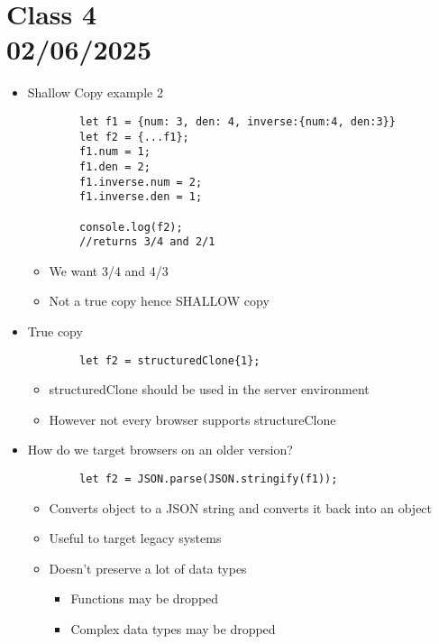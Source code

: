 \documentclass{article}
\begin{document}
\section*{Class 4 \\ 02/06/2025}\label{sec:Class 4}
\begin{itemize}
    \item Shallow Copy example 2
    \begin{lstlisting}
        let f1 = {num: 3, den: 4, inverse:{num:4, den:3}}
        let f2 = {...f1};
        f1.num = 1;
        f1.den = 2;
        f1.inverse.num = 2;
        f1.inverse.den = 1;
        
        console.log(f2);
        //returns 3/4 and 2/1
    \end{lstlisting}
    \begin{itemize}
        \item We want 3/4 and 4/3
        \item Not a true copy hence SHALLOW copy
    \end{itemize}
    \item True copy
    \begin{lstlisting}
        let f2 = structuredClone{1};
    \end{lstlisting}
    \begin{itemize}
        \item structuredClone should be used in the server environment
        \item However not every browser supports structureClone
    \end{itemize}
    \item How do we target browsers on an older version?
    \begin{lstlisting}
        let f2 = JSON.parse(JSON.stringify(f1));
    \end{lstlisting}
    \begin{itemize}
        \item Converts object to a JSON string and converts it back into an object
        \item Useful to target legacy systems
        \item Doesn't preserve a lot of data types
        \begin{itemize}
            \item Functions may be dropped
            \item Complex data types may be dropped
        \end{itemize}
    \end{itemize}

\end{itemize}
\end{document}
